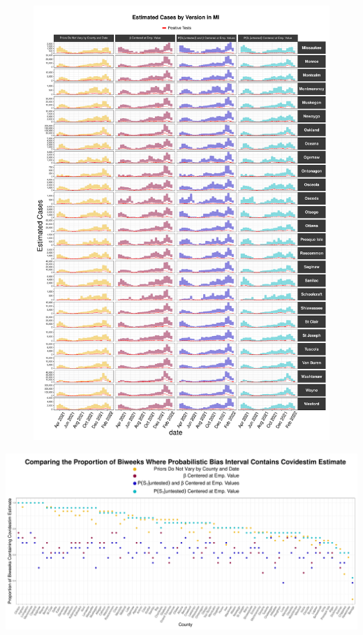 \documentclass[12pt,twoside]{smiththesis}
\begin{document}
\begin{figure}
\includegraphics[width=1\linewidth]{figure/mi3_pb_compared_to_observed} \caption{\label{fig:pb_versions_mi}}\label{fig:unnamed-chunk-74-3}
\end{figure}
\includegraphics[width=1\linewidth]{figure/mi_pb_compared_to_covidestim_proportions}
\end{document}
